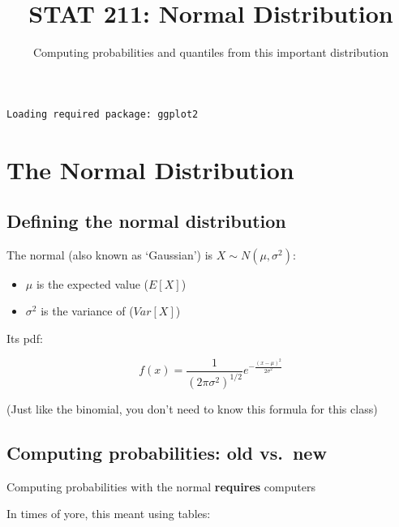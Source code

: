 \documentclass[
  letterpaper,
  DIV=11,
  numbers=noendperiod]{scrartcl}
\title{STAT 211: Normal Distribution}
\subtitle{Computing probabilities and quantiles from this important
distribution}
\author{}
\date{}
\providecommand{\tightlist}{%
  \setlength{\itemsep}{0pt}\setlength{\parskip}{0pt}}
\renewcommand*\contentsname{Table of contents}
\newcommand\contentsname{Table of contents}
\begin{document}
\maketitle

\renewcommand*\contentsname{Table of contents}
{
\hypersetup{linkcolor=}
\setcounter{tocdepth}{3}
\tableofcontents
}

\begin{verbatim}
Loading required package: ggplot2
\end{verbatim}

\section{The Normal Distribution}\label{the-normal-distribution}

\subsection{Defining the normal
distribution}\label{defining-the-normal-distribution}

The {normal} (also known as `Gaussian') is \(X\sim N(\mu,\sigma^2)\):

\begin{itemize}
\tightlist
\item
  \(\mu\) is the expected value (\(E[X]\))
\item
  \(\sigma^2\) is the variance of (\(Var[X]\))
\end{itemize}

Its pdf:

\[ 
f(x)=\frac1{(2\pi\sigma^2)^{1/2}}e^{-\frac{(x-\mu)^2}{2\sigma^2}} 
\]

{(Just like the binomial, you don't need to know this formula for this
class)}

\subsection{Computing probabilities: old
vs.~new}\label{computing-probabilities-old-vs.-new}

Computing probabilities with the normal \textbf{requires} computers

In times of yore, this meant using tables:
\end{document}

